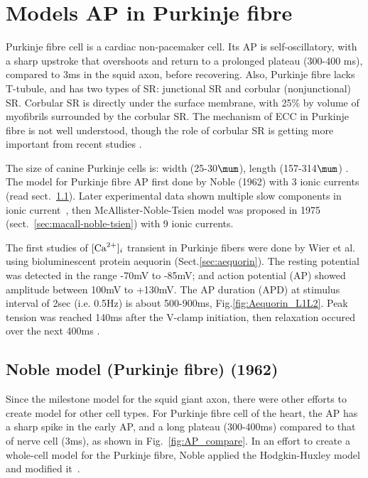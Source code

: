 
\chapter{Models AP in Purkinje fibre}
\label{chap:models-ap-purkinje}


Purkinje fibre cell is a cardiac non-pacemaker cell. Its AP is
self-oscillatory, with a sharp upstroke that overshoots and return to
a prolonged plateau (300-400 ms), compared to 3ms in the squid axon,
before recovering. Also, Purkinje fibre lacks T-tubule, and has two types of SR:
junctional SR and corbular (nonjunctional) SR. Corbular SR is directly under the
surface membrane, with 25\% by volume of myofibrils surrounded by the corbular
SR. The mechanism of ECC in Purkinje fibre is not well understood, though the
role of corbular SR is getting more important from recent studies
\citep{boyden2000}.

The size of canine Purkinje cells is: width (25-30$\mum$), length
(157-314$\mum$) \citep{wier2000}. The model for Purkinje fibre AP first done by
Noble (1962) with 3 ionic currents (read sect.~\ref{sec:noble-model}). Later
experimental data shown multiple slow components in ionic
current~\citep{noble1968krp,noble1969omc}, then McAllister-Noble-Tsien model
was proposed in 1975 (sect.~\ref{sec:macall-noble-tsien}) with 9 ionic currents.

The first studies of $[{\text{Ca}^{2+}}]_i$ transient in Purkinje fibers were done by Wier et
al. \citep{wier1980, wier1982} using bioluminescent protein aequorin
(Sect.\ref{sec:aequorin}).
The resting potential was detected in the range -70mV to -85mV; and action potential
(AP) showed amplitude between 100mV to +130mV. The AP duration (APD) at stimulus
interval of 2sec (i.e. 0.5Hz) is about 500-900ms, Fig.\ref{fig:Aequorin_L1L2}.
Peak tension was reached 140ms after the V-clamp initiation, then relaxation
occured over the next 400ms \citep{wier1982}.


\section{Noble model (Purkinje fibre) (1962)}
\label{sec:noble-model}


Since the milestone model for the squid giant axon, there were other
efforts to create model for other cell types. For Purkinje fibre cell
of the heart, the AP has a sharp spike in the early AP, and a long
plateau (300-400ms) compared to that of nerve cell (3ms), as shown in
Fig.~\ref{fig:AP_compare}. In an effort to create a whole-cell model
for the Purkinje fibre, Noble applied the Hodgkin-Huxley model and
modified it~\citep{noble1962mhh}.

